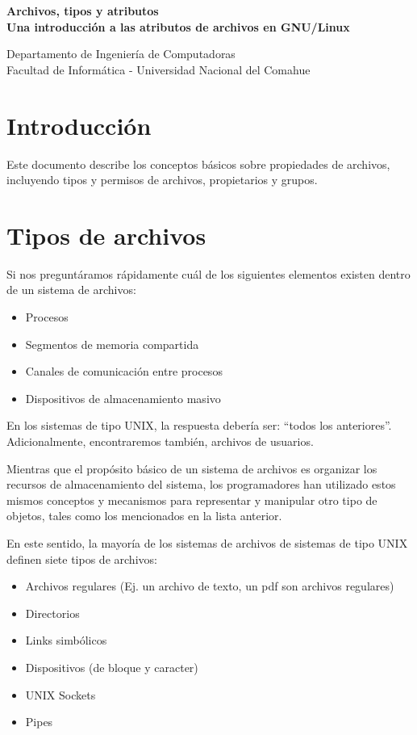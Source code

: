 \documentclass[12pt]{article}
\def\maketitle{

\makeatletter
{\color{bl} \centering \huge \sc \textbf{
Archivos, tipos y atributos \\
\large \vspace*{-8pt} \color{black} Una introducción a las atributos de archivos en GNU/Linux
 \vspace*{8pt} }\par}
 \makeatother


 \makeatletter
 {\centering \small 
 	Departamento de Ingeniería de Computadoras \\
 	Facultad de Informática - Universidad Nacional del Comahue \\
 	\vspace{20pt} }
 \makeatother

}
\begin{document}
\thispagestyle{empty}
\maketitle
\setlength{\parindent}{0pt}


\section*{Introducción}
Este documento describe los conceptos básicos sobre propiedades de archivos, 
incluyendo tipos y permisos de archivos, propietarios y grupos. 

\section*{Tipos de archivos}
Si nos preguntáramos rápidamente cuál de los siguientes elementos existen 
dentro de un sistema de archivos: 
\begin{itemize}
\item Procesos 
\item Segmentos de memoria compartida
\item Canales de comunicación entre procesos
\item Dispositivos de almacenamiento masivo 
\end{itemize}

En los sistemas de tipo UNIX, la respuesta debería ser: ``todos los 
anteriores''. Adicionalmente, encontraremos también, archivos de usuarios. 

Mientras que el propósito básico de un sistema de archivos es organizar 
los recursos de almacenamiento del  sistema, los programadores han utilizado
estos mismos conceptos y mecanismos para representar y manipular otro tipo 
de objetos, tales como los mencionados en la lista anterior. 

En este sentido, la mayoría de los sistemas de archivos de sistemas de 
tipo UNIX definen siete tipos de archivos:

\begin{itemize}
\item Archivos regulares (Ej. un archivo de texto, un pdf son archivos regulares)
\item Directorios
\item Links simbólicos
\item Dispositivos (de bloque y caracter) 
\item UNIX Sockets  
\item Pipes 
\end{itemize}
\end{document}
